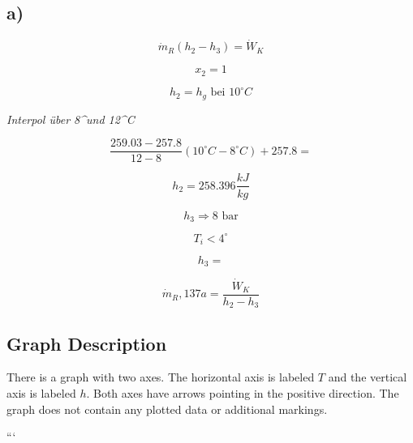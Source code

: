 

\subsection*{a)}

\[
\dot{m}_R (h_2 - h_3) = \dot{W}_K
\]

\[
x_2 = 1
\]

\[
h_2 = h_g \text{ bei } 10^\circ C
\]

\textit{Interpol über 8^\circ und 12^\circ C}

\[
\frac{259.03 - 257.8}{12 - 8} (10^\circ C - 8^\circ C) + 257.8 =
\]

\[
h_2 = 258.396 \frac{kJ}{kg}
\]

\[
h_3 \Rightarrow 8 \text{ bar}
\]

\[
T_i < 4^\circ
\]

\[
h_3 =
\]

\[
\dot{m}_R, 137a = \frac{\dot{W}_K}{h_2 - h_3}
\]

\subsection*{Graph Description}

There is a graph with two axes. The horizontal axis is labeled \( T \) and the vertical axis is labeled \( h \). Both axes have arrows pointing in the positive direction. The graph does not contain any plotted data or additional markings.

```